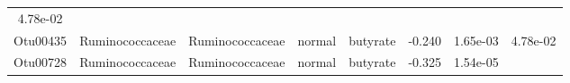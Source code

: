 \documentclass[11pt,]{article}
\begin{document}
\begin{longtable}[]{@{}cccccccc@{}}
\begin{minipage}[t]{0.08\columnwidth}
4.78e-02\strut
\end{minipage}\tabularnewline
\begin{minipage}[t]{0.08\columnwidth}\centering\strut
Otu00435\strut
\end{minipage} & \begin{minipage}[t]{0.15\columnwidth}\centering\strut
Ruminococcaceae\strut
\end{minipage} & \begin{minipage}[t]{0.15\columnwidth}\centering\strut
Ruminococcaceae\strut
\end{minipage} & \begin{minipage}[t]{0.08\columnwidth}\centering\strut
normal\strut
\end{minipage} & \begin{minipage}[t]{0.09\columnwidth}\centering\strut
butyrate\strut
\end{minipage} & \begin{minipage}[t]{0.07\columnwidth}\centering\strut
-0.240\strut
\end{minipage} & \begin{minipage}[t]{0.08\columnwidth}\centering\strut
1.65e-03\strut
\end{minipage} & \begin{minipage}[t]{0.08\columnwidth}\centering\strut
4.78e-02\strut
\end{minipage}\tabularnewline
\begin{minipage}[t]{0.08\columnwidth}\centering\strut
Otu00728\strut
\end{minipage} & \begin{minipage}[t]{0.15\columnwidth}\centering\strut
Ruminococcaceae\strut
\end{minipage} & \begin{minipage}[t]{0.15\columnwidth}\centering\strut
Ruminococcaceae\strut
\end{minipage} & \begin{minipage}[t]{0.08\columnwidth}\centering\strut
normal\strut
\end{minipage} & \begin{minipage}[t]{0.09\columnwidth}\centering\strut
butyrate\strut
\end{minipage} & \begin{minipage}[t]{0.07\columnwidth}\centering\strut
-0.325\strut
\end{minipage} & \begin{minipage}[t]{0.08\columnwidth}\centering\strut
1.54e-05\strut
\end{minipage} & \begin{minipage}[t]{0.08\columnwidth}\centering\strut

\end{minipage}
\end{longtable}
\end{document}
